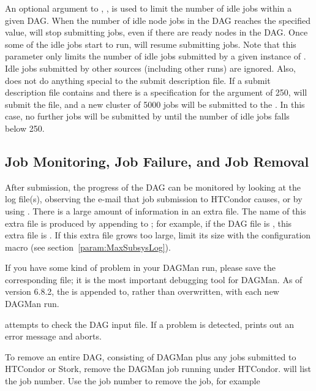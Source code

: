 An optional argument to , , 
is used to limit the number of idle jobs within a given DAG.
When the number of idle node jobs in the DAG reaches the specified
value,  will stop submitting jobs, even if there
are ready nodes in the DAG.  Once some of the idle jobs start to
run,  will resume submitting jobs.  Note that this
parameter only limits the number of idle jobs submitted by a
given instance of . Idle jobs submitted by other sources
(including other  runs) are ignored. 
Also, 
does not do anything special to the submit description file.
If a submit description file contains
 and there is a specification for the  
argument of 250, 
 will submit the file, 
and a new cluster of 5000 jobs will be submitted to the .
In this case, no further jobs will be submitted by 
until the number of idle jobs falls below 250. 

\subsection{Job Monitoring, Job Failure, and Job Removal}

After submission, the progress of the DAG can be monitored
by looking at the log file(s),
observing the e-mail that job submission to HTCondor causes,
or by using  .
There is a large amount of information in an extra file.
The name of this extra file is produced by appending
 to ; for example, if the
DAG file is , this extra file is
.
If this extra file grows too large, limit its size
with the  configuration macro (see
section~\ref{param:MaxSubsysLog}).

If you have some kind of problem in your DAGMan run, please save
the corresponding  file; it is the most important
debugging tool for DAGMan.  As of version 6.8.2, the 
is appended to, rather than overwritten, with each new DAGMan run.


 attempts to check the DAG input file.
If a problem is detected,
 prints out an error message and aborts.

To remove an entire DAG, consisting of DAGMan plus
any jobs submitted to HTCondor or Stork,
remove the DAGMan job running under HTCondor.
 will list the job number.
Use the job number to remove the job, for example


